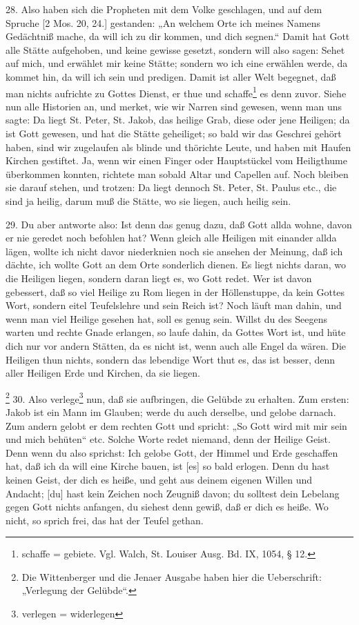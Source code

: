 28. Also haben sich die Propheten mit dem Volke geschlagen, und auf dem Spruche [2 Mos. 20, 24.] gestanden: „An welchem Orte ich meines Namens Gedächtniß mache, da will ich zu dir kommen, und dich segnen.“ Damit hat Gott alle Stätte aufgehoben, und keine gewisse gesetzt, sondern will also sagen: Sehet auf mich, und erwählet mir keine Stätte; sondern wo ich eine erwählen werde, da kommet hin, da will ich sein und predigen. Damit ist aller Welt begegnet, daß man nichts aufrichte zu Gottes Dienst, er thue und schaffe\footnote{schaffe = gebiete. Vgl. Walch, St. Louiser Ausg. Bd. IX, 1054, § 12.} es denn zuvor. Siehe nun alle Historien an, und merket, wie wir Narren sind gewesen, wenn man uns sagte: Da liegt St. Peter, St. Jakob, das heilige Grab, diese oder jene Heiligen; da ist Gott gewesen, und hat die Stätte geheiliget; so bald wir das Geschrei gehört haben, sind wir zugelaufen als blinde und thörichte Leute, und haben mit Haufen Kirchen gestiftet. Ja, wenn wir einen Finger oder Hauptstückel vom Heiligthume überkommen konnten, richtete man sobald Altar und Capellen auf. Noch bleiben sie darauf stehen, und trotzen: Da liegt dennoch St. Peter, St. Paulus etc., die sind ja heilig, darum muß die Stätte, wo sie liegen, auch heilig sein.

29. Du aber antworte also: Ist denn das genug dazu, daß Gott allda wohne, davon er nie geredet noch befohlen hat? Wenn gleich alle Heiligen mit einander allda lägen, wollte ich nicht davor niederknien noch sie ansehen der Meinung, daß ich dächte, ich wollte Gott an dem Orte sonderlich dienen. Es liegt nichts daran, wo die Heiligen liegen, sondern daran liegt es, wo Gott redet. Wer ist davon gebessert, daß so viel Heilige zu Rom liegen in der Höllenstuppe, da kein Gottes Wort, sondern
eitel Teufelslehre und sein Reich ist? Noch läuft man dahin, und wenn man viel Heilige gesehen hat, soll es genug sein. Willst du des Seegens warten und rechte Gnade erlangen, so laufe dahin, da Gottes Wort ist, und hüte dich nur vor andern Stätten, da es nicht ist, wenn auch alle Engel da wären. Die Heiligen thun nichts, sondern das lebendige Wort thut es, das ist besser, denn aller Heiligen Erde und Kirchen, da sie liegen.

\footnote{Die Wittenberger und die Jenaer Ausgabe haben hier die Ueberschrift: „Verlegung der Gelübde“.} 30. Also verlege\footnote{verlegen = widerlegen} nun, daß sie aufbringen, die Gelübde zu erhalten. Zum ersten: Jakob ist ein Mann im Glauben; werde du auch derselbe, und gelobe darnach. Zum andern gelobt er dem rechten Gott und spricht: „So Gott wird mit mir sein und mich behüten“ etc. Solche Worte redet niemand, denn der Heilige Geist. Denn wenn du also sprichst: Ich gelobe Gott, der Himmel und Erde geschaffen hat, daß ich da will eine Kirche bauen, ist [es] so bald erlogen. Denn du hast keinen Geist, der dich es heiße, und geht aus deinem eigenen Willen und Andacht; [du] hast kein Zeichen noch Zeugniß davon; du solltest dein Lebelang gegen Gott nichts anfangen, du siehest denn gewiß, daß er dich es heiße. Wo nicht, so sprich frei, das hat der Teufel gethan.

